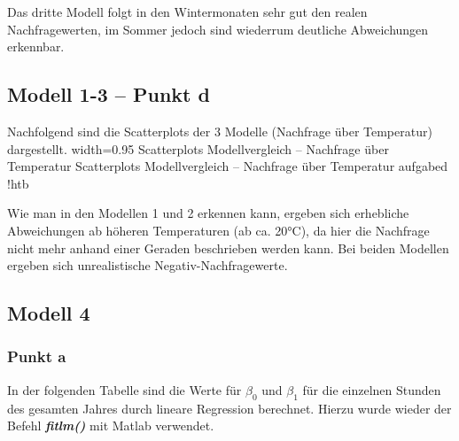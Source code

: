 \documentclass{eegreport}
\begin{document}
Das dritte Modell folgt in den Wintermonaten sehr gut den realen Nachfragewerten, im Sommer jedoch sind wiederrum deutliche Abweichungen erkennbar.

\subsection{Modell 1-3 – Punkt d}
Nachfolgend sind die Scatterplots der 3 Modelle (Nachfrage über Temperatur) dargestellt.
\newpage
{}
{width=0.95\textwidth}
{Scatterplots Modellvergleich – Nachfrage über Temperatur}
{Scatterplots Modellvergleich – Nachfrage über Temperatur}
{aufgabed}
{!htb}

Wie man in den Modellen 1 und 2 erkennen kann, ergeben sich erhebliche Abweichungen ab höheren Temperaturen (ab ca. 20°C), da hier die Nachfrage nicht mehr anhand einer Geraden beschrieben werden kann. Bei beiden Modellen ergeben sich unrealistische Negativ-Nachfragewerte.


\subsection{Modell 4}
\subsubsection{Punkt a}

In der folgenden Tabelle sind die Werte für $\beta_0$ und $\beta_1$ für die einzelnen Stunden des gesamten Jahres durch lineare Regression berechnet. Hierzu wurde wieder der Befehl \textbf{\emph{fitlm()}} mit Matlab verwendet.
\end{document}
